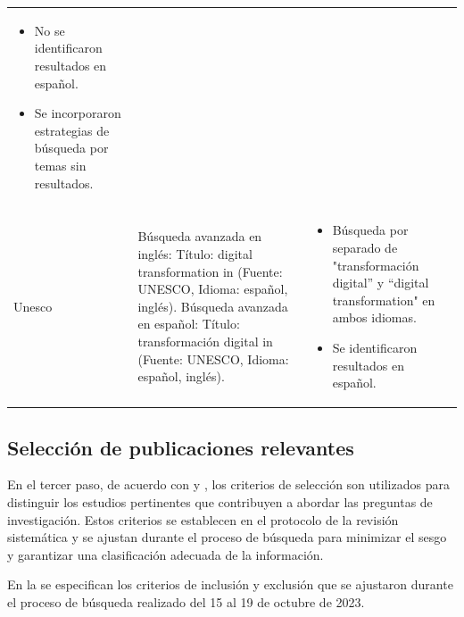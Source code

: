 \begin{table}[htbp]
\begin{tabular}{l >{\raggedright\arraybackslash}p{}>{\raggedright\arraybackslash}p{}}
\begin{itemize}[leftmargin=*, nosep]
                \item No se identificaron resultados en español.
                \item Se incorporaron estrategias de búsqueda por temas sin resultados.
            \end{itemize} \\
            Unesco & Búsqueda avanzada en inglés: Título: digital transformation in (Fuente: UNESCO, Idioma: español, inglés). 
            Búsqueda avanzada en español: Título: transformación digital in (Fuente: UNESCO, Idioma: español, inglés). & \begin{itemize}[leftmargin=*, nosep]
                \item Búsqueda por separado de "transformación digital'' y ``digital transformation" en ambos idiomas.
                \item Se identificaron resultados en español.
            \end{itemize} \\
            \bottomrule
        \end{tabular}
    \end{table}
    
    \subsection{Selección de publicaciones relevantes}\label{sub-sec-seleccion-de-publicaciones-relevantes}
    
    En el tercer paso, de acuerdo con \textcite{Kitchenham2007} y \textcite{Petersen2008SystematicMapping,PETERSEN20151}, los criterios de selección son
    utilizados para distinguir los estudios pertinentes que contribuyen a
    abordar las preguntas de investigación. Estos criterios se establecen en
    el protocolo de la revisión sistemática y se ajustan durante el proceso
    de búsqueda para minimizar el sesgo y garantizar una clasificación
    adecuada de la información.
    
    En la  se especifican los criterios de inclusión y exclusión que
    se ajustaron durante el proceso de búsqueda realizado del 15 al 19 de
    octubre de 2023.
    
